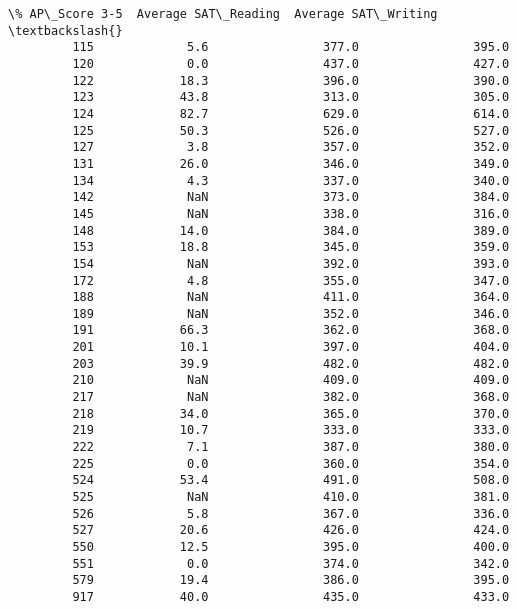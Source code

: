 \documentclass[11pt]{article}
\begin{document}
\begin{Verbatim}[commandchars=\\\{\}]
              \% AP\_Score 3-5  Average SAT\_Reading  Average SAT\_Writing  \textbackslash{}
         115             5.6                377.0                395.0   
         120             0.0                437.0                427.0   
         122            18.3                396.0                390.0   
         123            43.8                313.0                305.0   
         124            82.7                629.0                614.0   
         125            50.3                526.0                527.0   
         127             3.8                357.0                352.0   
         131            26.0                346.0                349.0   
         134             4.3                337.0                340.0   
         142             NaN                373.0                384.0   
         145             NaN                338.0                316.0   
         148            14.0                384.0                389.0   
         153            18.8                345.0                359.0   
         154             NaN                392.0                393.0   
         172             4.8                355.0                347.0   
         188             NaN                411.0                364.0   
         189             NaN                352.0                346.0   
         191            66.3                362.0                368.0   
         201            10.1                397.0                404.0   
         203            39.9                482.0                482.0   
         210             NaN                409.0                409.0   
         217             NaN                382.0                368.0   
         218            34.0                365.0                370.0   
         219            10.7                333.0                333.0   
         222             7.1                387.0                380.0   
         225             0.0                360.0                354.0   
         524            53.4                491.0                508.0   
         525             NaN                410.0                381.0   
         526             5.8                367.0                336.0   
         527            20.6                426.0                424.0   
         550            12.5                395.0                400.0   
         551             0.0                374.0                342.0   
         579            19.4                386.0                395.0   
         917            40.0                435.0                433.0   
         

\end{Verbatim}
\end{document}
